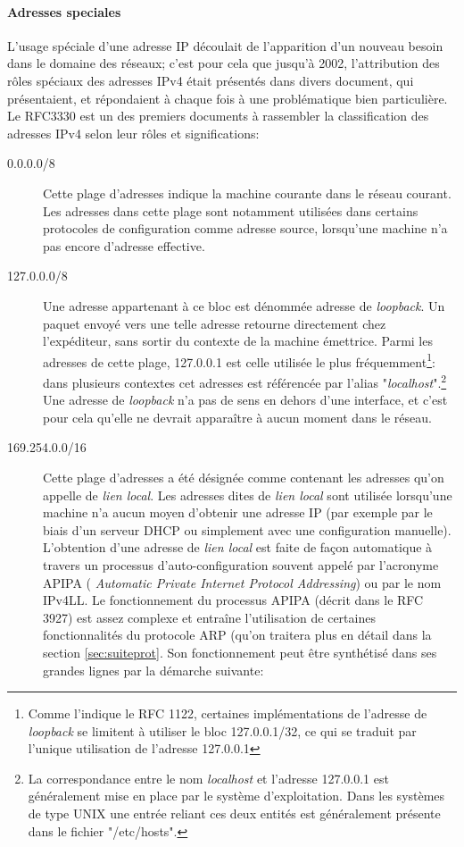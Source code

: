\paragraph{Adresses speciales}
L'usage spéciale d'une adresse IP découlait de l'apparition d'un nouveau besoin
dans le domaine des réseaux; c'est pour cela que jusqu'à 2002, l'attribution des
rôles spéciaux des adresses IPv4 était présentés dans divers document, qui
présentaient, et répondaient à chaque fois à une problématique bien
particulière. Le RFC3330 est un des premiers documents à rassembler la
classification des adresses IPv4 selon leur rôles et significations:

\begin{description}
\item[0.0.0.0/8]
Cette plage d'adresses indique la machine courante dans le réseau courant.
Les adresses dans cette plage sont notamment utilisées dans certains protocoles de
configuration comme adresse source, lorsqu'une machine n'a pas encore d'adresse effective.

\item[127.0.0.0/8]
Une adresse appartenant à ce bloc est dénommée adresse de {\it loopback}.  Un
paquet envoyé vers une telle adresse retourne directement chez l'expéditeur, sans sortir
du contexte de la machine émettrice. Parmi les adresses de cette plage,
127.0.0.1 est celle utilisée le plus fréquemment\footnote{Comme l'indique
le RFC 1122, certaines implémentations de l'adresse de {\it loopback} se
limitent à utiliser le bloc 127.0.0.1/32, ce qui se traduit par l'unique utilisation de
l'adresse 127.0.0.1 }: dans plusieurs contextes cet adresses est référencée par
l'alias "{\it localhost}".\footnote{La correspondance entre le nom {\it localhost} et
l'adresse 127.0.0.1 est généralement mise en place par le système d'exploitation.
Dans les systèmes de type UNIX une entrée reliant ces deux entités est généralement
présente dans le fichier "/etc/hosts".}
Une adresse de {\it loopback} n'a pas de sens en dehors d'une interface,
et c'est pour cela qu'elle ne devrait apparaître à aucun moment dans le réseau.

\item[169.254.0.0/16]
Cette plage d'adresses a été désignée comme contenant les adresses qu'on appelle
de {\it lien local}.  Les adresses dites de {\it lien local} sont utilisée lorsqu'une 
machine n'a aucun moyen d'obtenir une adresse IP (par exemple par le biais
d'un serveur DHCP ou simplement avec une configuration manuelle).  L'obtention
d'une adresse de {\it lien local} est faite de façon automatique à travers un
processus d'auto-configuration souvent appelé par l'acronyme APIPA ({\it
Automatic Private Internet Protocol Addressing}) ou par le nom IPv4LL.  Le
fonctionnement du processus APIPA (décrit dans le RFC 3927) est assez complexe
 et entraîne l'utilisation de certaines fonctionnalités du
protocole ARP (qu'on traitera plus en détail dans la section
\ref{sec:suiteprot}. Son fonctionnement peut être synthétisé dans ses grandes
lignes par la démarche suivante:


\end{description}
